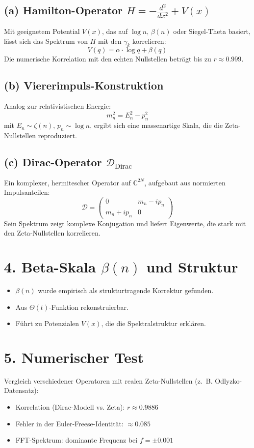 \documentclass[12pt]{article}
\begin{document}
\subsection*{(a) Hamilton-Operator \( H = -\frac{d^2}{dx^2} + V(x) \)}
Mit geeignetem Potential \(V(x)\), das auf \(\log n\), \(\beta(n)\) oder Siegel-Theta basiert, lässt sich das Spektrum von \(H\) mit den \(\gamma_k\) korrelieren:
\[
V(q) = \alpha \cdot \log q + \beta(q)
\]
Die numerische Korrelation mit den echten Nullstellen beträgt bis zu \(r \approx 0.999\).

\subsection*{(b) Viererimpuls-Konstruktion}
Analog zur relativistischen Energie:
\[
m_n^2 = E_n^2 - p_n^2
\]
mit \(E_n \sim \zeta(n)\), \(p_n \sim \log n\), ergibt sich eine massenartige Skala, die die Zeta-Nullstellen reproduziert.

\subsection*{(c) Dirac-Operator \(\mathcal{D}_{\text{Dirac}}\)}
Ein komplexer, hermitescher Operator auf \(\mathbb{C}^{2N}\), aufgebaut aus normierten Impulsanteilen:
\[
\mathcal{D} = \begin{pmatrix}
0 & m_n - i p_n \\
m_n + i p_n & 0
\end{pmatrix}
\]
Sein Spektrum zeigt komplexe Konjugation und liefert Eigenwerte, die stark mit den Zeta-Nullstellen korrelieren.

\section*{4. Beta-Skala \(\beta(n)\) und Struktur}
\begin{itemize}
  \item \(\beta(n)\) wurde empirisch als strukturtragende Korrektur gefunden.
  \item Aus \(\Theta(t)\)-Funktion rekonstruierbar.
  \item Führt zu Potenzialen \(V(x)\), die die Spektralstruktur erklären.
\end{itemize}

\section*{5. Numerischer Test}
Vergleich verschiedener Operatoren mit realen Zeta-Nullstellen (z.~B. Odlyzko-Datensatz):
\begin{itemize}
  \item Korrelation (Dirac-Modell vs. Zeta): \(r \approx 0.9886\)
  \item Fehler in der Euler-Freese-Identität: \(\approx 0.085\)
  \item FFT-Spektrum: dominante Frequenz bei \(f = \pm 0.001\)
\end{itemize}
\end{document}
